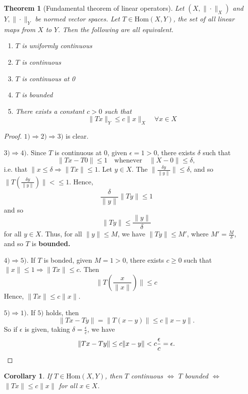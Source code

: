 \documentclass[10pt, oneside, reqno]{amsbook}
\theoremstyle{plain}%
\newtheorem{thm}{Theorem}[section]
\newtheorem*{cor}{Corollary}
\theoremstyle{definition}
\theoremstyle{remark}
\begin{document}
\begin{thm}[Fundamental theorem of linear operators]
    Let $( X, \| \cdot \|_X)$ and $Y, \| \cdot \|_Y$ be normed vector spaces.  Let $ T \in \text{Hom}(X,Y)$, the set of all linear maps from $X$ to $Y$.  Then the following are all equivalent.
    \begin{enumerate}[1)]
        \item $T$ is uniformly continuous
        \item $T$ is continuous
        \item $T$ is continuous at 0
        \item $T$ is bounded
        \item There exists a constant $c > 0$ such that \[
            \| Tx \|_Y \leq c \| x \|_X \quad \forall x \in X
        \]
    \end{enumerate}
\end{thm}

\begin{proof}
    $1) \Rightarrow 2) \Rightarrow 3)$ is clear.
    
    $3) \Rightarrow 4)$.  Since $T$ is continuous at 0, given $\epsilon = 1 > 0$, there exists $\delta$ such that \[
        \| Tx - T0 \| \leq 1 \quad \text{whenever} \quad \| X - 0 \| \leq \delta,
    \] i.e. that $\| x \leq \delta \Rightarrow \| Tx \| \leq 1$.  Let $y \in X$.  The $\| \frac{\delta y}{\| y \|} \| \leq \delta$, and so $\| T\left( \frac{\delta y}{\| y \|} \right) \| < \leq 1$.  Hence, \[
        \frac{\delta}{\|y \|} \|T y \| \leq 1
    \] and so \[
        \|Ty \| \leq \frac{ \| y \|}{\delta}
    \] for all $y \in X$.  Thus, for all $\| y \| \leq M$, we have $\| Ty \| \leq M'$, where $M' = \frac{M}{\delta}$, and so $T$ is \textbf{bounded.} 
    
    $4) \Rightarrow 5)$.  If $T$ is bonded, given $M = 1 > 0$, there exists $c \geq 0$ such that $\| x \| \leq 1 \Rightarrow \|T x \| \leq c$.  Then \[
         \|T \left( \frac{x}{\|x \|} \right) \| \leq c  \] 
        Hence, $\|Tx \| \leq c \| x \|$.  
        
    $5) \Rightarrow 1)$.  If $5)$ holds, then  \[
        \| Tx - Ty \| = \| T(x-y) \| \leq c \| x - y \|.
    \]  So if $\epsilon$ is given, taking $\delta = \frac{\epsilon}{c}$, we have \[
        \|Tx - Ty \| \leq c \| x - y \| < c \frac{\epsilon}{c} = \epsilon. \qedhere
    \]
\end{proof}

\begin{cor}
    If $T \in \text{Hom}(X,Y)$, then $T$ continuous $\iff$ $T$ bounded $\iff$ $\|Tx \| \leq c \| x \|$ for all $x \in X$.
\end{cor}
\end{document}
